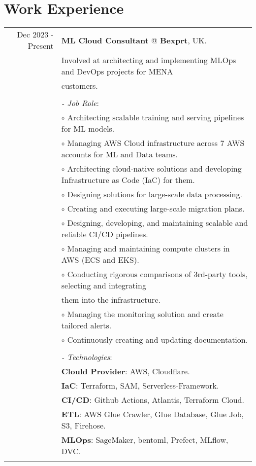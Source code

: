 \documentclass[a4paper,10pt]{article}
\begin{document}
\section{\textbf{Work Experience}}
\begin{longtable}{r|l}
    Dec 2023 - Present& \textbf{ML Cloud Consultant} @
    \textbf{Bexprt}, UK. \\&
    Involved at architecting and implementing MLOps and DevOps projects for MENA \\& customers. \\&
    \\&
    \textit{- Job Role}:\\&
    $\circ$ Architecting scalable training and serving pipelines for ML models. \\ &
    $\circ$ Managing AWS Cloud infrastructure across 7 AWS accounts for ML and Data teams. \\ &
    $\circ$ Architecting cloud-native solutions and developing Infrastructure as Code (IaC) for them. \\ &
    $\circ$ Designing solutions for large-scale data processing. \\ &
    $\circ$ Creating and executing large-scale migration plans. \\ &
    $\circ$ Designing, developing, and maintaining scalable and reliable CI/CD pipelines. \\ &
    $\circ$ Managing and maintaining compute clusters in AWS (ECS and EKS). \\ &
    $\circ$ Conducting rigorous comparisons of 3rd-party tools, selecting and integrating \\ & them into the infrastructure. \\ &
    $\circ$ Managing the monitoring solution and create tailored alerts. \\ &
    $\circ$ Continuously creating and updating documentation. \\ &
    \\&
    \textit{- Technologies}:\\&
    \textbf{Clould Provider}: AWS, Cloudflare. \\&
    \textbf{IaC}: Terraform, SAM, Serverless-Framework. \\&
    \textbf{CI/CD}: Github Actions, Atlantis, Terraform Cloud. \\&
    \textbf{ETL}: AWS Glue Crawler, Glue Database, Glue Job, S3, Firehose. \\&
    \textbf{MLOps}: SageMaker, bentoml, Prefect, MLflow, DVC. \\&

\end{longtable}
\end{document}
